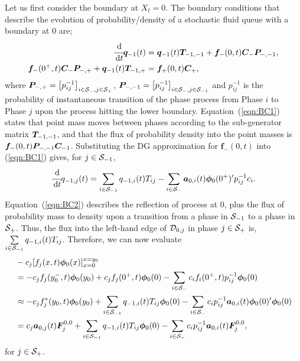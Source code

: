 Let us first consider the boundary at \( X_t=0\). The boundary conditions that describe the evolution of probability/density of a stochastic fluid queue with a boundary at \(0\) are;
\begin{align}\label{eqn:BC1}
\cfrac{\, \mathrm{d}}{\, \mathrm{d} t}\boldsymbol q_{-1}(t) &= \boldsymbol q_{-1}(t) \boldsymbol T_{{-1},{-1}} + \boldsymbol f_-(0,t)\boldsymbol C_-\boldsymbol P_{-,{-1}},
\\\label{eqn:BC2}
\boldsymbol f_-(0^+,t)\boldsymbol C_-\boldsymbol P_{-,+} + \boldsymbol q_{-1}(t)\boldsymbol T_{{-1},+}&=\boldsymbol f_+(0,t)\boldsymbol C_+,
\end{align}
where \(\boldsymbol P_{-,+} = \left[p_{ij}^{-1}\right]_{i\in\mathcal{S}_-,j\in\mathcal{S}_{+}}\), \(\boldsymbol P_{-,{-1}} = \left[p_{ij}^{-1}\right]_{i\in\mathcal{S}_-,j\in\mathcal{S}_{-1}}\) and \(p_{ij}^{-1}\) is the probability of instantaneous transition of the phase process from Phase \(i\) to Phase \(j\) upon the process hitting the lower boundary. Equation~(\ref{eqn:BC1}) states that point mass moves between phases according to the sub-generator matrix \(\boldsymbol T_{{-1},{-1}}\), and that the flux of probability density into the point masses is \(\boldsymbol f_-(0,t)\boldsymbol P_{-,{-1}}\boldsymbol C_{-1}\). Substituting the DG approximation for \(\boldsymbol f_-(0,t)\) into (\ref{eqn:BC1}) gives, for \(j\in\mathcal{S}_{-1}\), 
\begin{equation*}\label{eqn:DGBC1}
\cfrac{\, \mathrm{d}}{\, \mathrm{d} t} q_{{-1},j}(t) = \sum_{i\in\mathcal{S}_{-1}} q_{{-1},i}(t) T_{i j} - \sum_{i\in\mathcal{S}_-}\boldsymbol a_{0,i}(t)\boldsymbol \phi_0(0^+)'{}p_{ij}^{-1} c_i.
\end{equation*}
Equation~(\ref{eqn:BC2}) describes the reflection of process at \(0\), plus the flux of probability mass to density upon a transition from a phase in \(\mathcal{S}_{-1}\) to a phase in \(\mathcal{S}_+\). Thus, the flux into the left-hand edge of \(\mathcal{D}_{0,j}\) in phase \(j\in\mathcal{S}_+\) is, \(\sum\limits_{i\in\mathcal{S}_{-1}} q_{{-1},i}(t)T_{ij}\). Therefore, we can now evaluate 
\begin{align*}
	&-c_j[f_j(x,t)\boldsymbol\phi_0(x)]_{x=0}^{x=y_{0}} 
	\\& =  -c_jf_j(y_0^-,t)\boldsymbol\phi_0(y_0)+c_jf_j(0^+,t)\boldsymbol\phi_0(0) - \sum_{i\in\mathcal{S}_-}c_if_i(0^+,t)p_{ij}^{-1}\boldsymbol \phi_0(0)
	\\& \approx -c_j f_j^*(y_0,t)\boldsymbol\phi_0(y_0)+\sum_{i\in\mathcal{S}_{-1}}q_{{-1},i}(t)T_{ij}\boldsymbol\phi_0(0) - \sum_{i\in\mathcal{S}_-}c_ip_{ij}^{-1}\boldsymbol a_{0,i}(t)\boldsymbol \phi_0(0)'{}\boldsymbol \phi_0(0)
	\\& = c_j\boldsymbol a_{0,j}(t)\boldsymbol F_j^{0,0}+\sum_{i\in\mathcal{S}_{-1}}q_{{-1},i}(t)T_{ij}\boldsymbol\phi_0(0) - \sum_{i\in\mathcal{S}_-}c_ip_{ij}^{-1}\boldsymbol a_{0,i}(t)\boldsymbol F_j^{0,0},
\end{align*}
for \(j \in \mathcal{S}_+\). 

